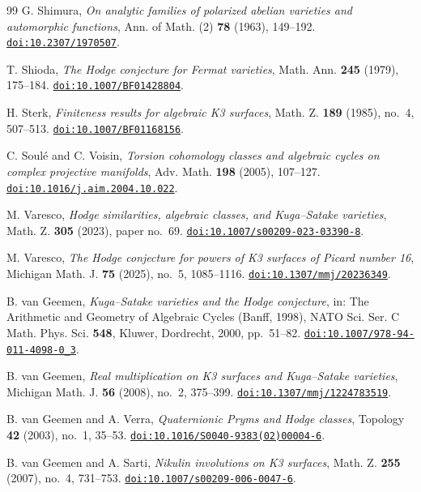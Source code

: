 \begin{thebibliography}{99}
G. Shimura,
\emph{On analytic families of polarized abelian varieties and automorphic functions},
Ann. of Math. (2) \textbf{78} (1963), 149--192.
\href{https://doi.org/10.2307/1970507}{\nolinkurl{doi:10.2307/1970507}}.

T. Shioda,
\emph{The Hodge conjecture for Fermat varieties},
Math. Ann. \textbf{245} (1979), 175--184.
\href{https://doi.org/10.1007/BF01428804}{\nolinkurl{doi:10.1007/BF01428804}}.

H. Sterk,
\emph{Finiteness results for algebraic K3 surfaces},
Math. Z. \textbf{189} (1985), no.~4, 507--513.
\href{https://doi.org/10.1007/BF01168156}{\nolinkurl{doi:10.1007/BF01168156}}.

C. Soul\'e and C. Voisin,
\emph{Torsion cohomology classes and algebraic cycles on complex projective manifolds},
Adv. Math. \textbf{198} (2005), 107--127.
\href{https://doi.org/10.1016/j.aim.2004.10.022}{\nolinkurl{doi:10.1016/j.aim.2004.10.022}}.

M. Varesco,
\emph{Hodge similarities, algebraic classes, and Kuga--Satake varieties},
Math. Z. \textbf{305} (2023), paper no.~69.
\href{https://doi.org/10.1007/s00209-023-03390-8}{\nolinkurl{doi:10.1007/s00209-023-03390-8}}.

M. Varesco,
\emph{The Hodge conjecture for powers of K3 surfaces of Picard number 16},
Michigan Math. J. \textbf{75} (2025), no.~5, 1085--1116.
\href{https://doi.org/10.1307/mmj/20236349}{\nolinkurl{doi:10.1307/mmj/20236349}}.

B. van Geemen,
\emph{Kuga--Satake varieties and the Hodge conjecture},
in: The Arithmetic and Geometry of Algebraic Cycles (Banff, 1998),
NATO Sci. Ser. C Math. Phys. Sci. \textbf{548},
Kluwer, Dordrecht, 2000, pp.~51--82.
\href{https://doi.org/10.1007/978-94-011-4098-0_3}{\nolinkurl{doi:10.1007/978-94-011-4098-0_3}}.

B. van Geemen,
\emph{Real multiplication on K3 surfaces and Kuga--Satake varieties},
Michigan Math. J. \textbf{56} (2008), no.~2, 375--399.
\href{https://doi.org/10.1307/mmj/1224783519}{\nolinkurl{doi:10.1307/mmj/1224783519}}.

B. van Geemen and A. Verra,
\emph{Quaternionic Pryms and Hodge classes},
Topology \textbf{42} (2003), no.~1, 35--53.
\href{https://doi.org/10.1016/S0040-9383(02)00004-6}{\nolinkurl{doi:10.1016/S0040-9383(02)00004-6}}.

B. van Geemen and A. Sarti,
\emph{Nikulin involutions on K3 surfaces},
Math. Z. \textbf{255} (2007), no.~4, 731--753.
\href{https://doi.org/10.1007/s00209-006-0047-6}{\nolinkurl{doi:10.1007/s00209-006-0047-6}}.


\end{thebibliography}
